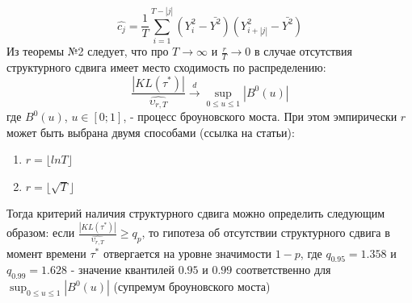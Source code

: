 \documentclass[a4paper,14pt,russian]{extarticle}
\begin{document}
	\begin{equation}
		\hat{c_j} = \frac{1}{T} \sum_{i=1}^{T - |j|} (Y_i^2 - \bar{Y^2})(Y_{i + |j|}^2 - \bar{Y^2})
	\end{equation}
	Из теоремы №2 следует, что про $T \to \infty$ и $\frac{r}{T} \to 0$ в случае отсутствия структурного сдвига имеет место сходимость по распределению:
	\begin{equation}
		\frac{|KL(\tau^*)|}{\hat{\upsilon_{r,T}}} \xrightarrow[]{d} \sup_{0 \leq u \leq 1}|B^0(u)|
	\end{equation}
	где $B^0(u)$, $u \in \left[0; 1\right]$, - процесс броуновского моста. При этом эмпирически $r$ может быть выбрана двумя способами (ссылка на статьи):
	\begin{enumerate}
		\item $r = \lfloor lnT \rfloor$
		\item $r = \lfloor \sqrt{T} \rfloor$
	\end{enumerate}
	Тогда критерий наличия структурного сдвига можно определить следующим образом: если $\frac{|KL(\tau^*)|}{\hat{\upsilon_{r,T}}} \geq q_p$, то гипотеза об отсутствии структурного сдвига в момент времени $\tau^*$ отвергается на уровне значимости $1 - p$, где $q_{0.95} = 1.358$ и $q_{0.99} = 1.628$ - значение квантилей $0.95$ и $0.99$ соответственно для $\sup_{0 \leq u \leq 1}|B^0(u)|$ (супремум броуновского моста)
	
	
	
	\clearpage
\end{document}
